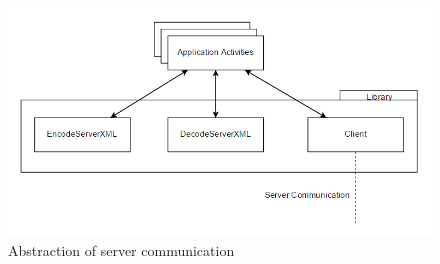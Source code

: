 \begin{figure}[H]
\centering
\includegraphics[width=\textwidth]{billeder/appcommunication.png}
\caption{Abstraction of server communication}
\label{fig:appcommunication}
\end{figure}
